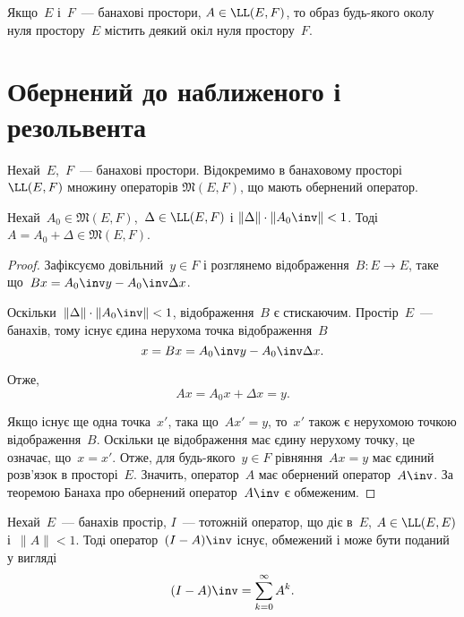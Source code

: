 \begin{corollary}
Якщо~$E$ і~$F$~--- банахові простори,
$A \in \LL(E, F)$, то образ будь-якого околу нуля простору~$E$
містить деякий окіл нуля простору~$F$.
\end{corollary}

\section{Обернений до наближеного і резольвента}

Нехай~$E$,~$F$~--- банахові простори. Відокремимо в
банаховому просторі~$\LL(E, F)$ множину операторів
$\mathfrak{M}(E, F)$, що мають обернений оператор.

\begin{theorem}
Нехай~$A_0 \in \mathfrak{M}(E, F)$,~$\Delta \in \LL(E, F)$ і
$\|\Delta\| \cdot \|A_0\inv\| < 1$.
Тоді~$A = A_0 + \Delta \in \mathfrak{M}(E, F)$.
\end{theorem}

\begin{proof}
Зафіксуємо довільний~$y \in F$ і розглянемо
відображення~$B: E \to E$, таке що~$B x = A_0\inv y - A_0\inv \Delta x$.

Оскільки~$\|\Delta\| \cdot \|A_0\inv\| < 1$, відображення~$B$ є стискаючим.
Простір~$E$~--- банахів, тому існує єдина нерухома точка відображення~$B$
\begin{equation*}
    x = B x = A_0\inv y - A_0\inv \Delta x.
\end{equation*}

Отже,
\begin{equation*}
    A x = A_0 x + \Delta x = y.
\end{equation*}

Якщо існує ще одна точка~$x'$, така що~$A x' = y$,
то~$x'$ також є нерухомою точкою відображення~$B$.
Оскільки це відображення має єдину нерухому точку,
це означає, що~$x = x'$.
Отже, для будь-якого~$y \in F$ рівняння~$A x = y$
має єдиний розв’язок в просторі~$E$.
Значить, оператор~$A$ має обернений оператор~$A\inv$.
За теоремою Банаха про обернений оператор~$A\inv$ є обмеженим. 
\end{proof}

\begin{theorem}
Нехай~$E$~--- банахів простір,
$I$~--- тотожній оператор, що діє в~$E$,
$A \in \LL(E, E)$ і~$\|A\| < 1$.
Тоді оператор~$(I - A)\inv$ існує, обмежений
і може бути поданий у вигляді
\begin{equation*}
    (I - A)\inv = \sum_{k = 0}^\infty A^k.
\end{equation*}
\end{theorem}

